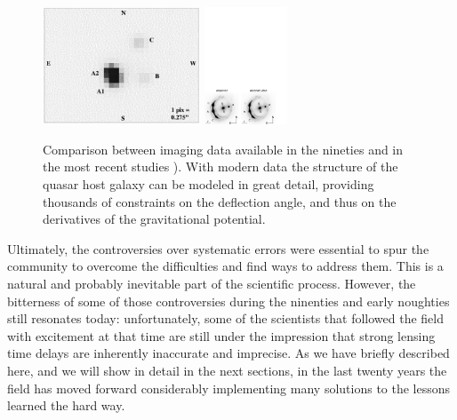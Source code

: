\begin{figure}
\includegraphics[height=3.5cm]{figures/pg1115_blowup.png}
\includegraphics[height=3.5cm]{figures/Suyu14_fig1.pdf}
\caption{Comparison between imaging data available in the nineties
\citep[left panel, from][]{Sch++97} and in the most recent studies
\citep[middle and right panels, from][]{Suy++14}). With modern data the
structure of the quasar host galaxy can be modeled in great detail,
providing thousands of constraints on the deflection angle, and thus on
the derivatives of the gravitational potential.}
\label{fig:oldvsmodernimage}
\end{figure}

Ultimately, the controversies over systematic errors were essential to
spur the community to overcome the difficulties and find ways to
address them. This is a natural and probably inevitable part of the
scientific process. However, the bitterness of some of those
controversies during the ninenties and early noughties still resonates
today: unfortunately, some of the scientists that followed the field
with excitement at that time are still under the impression that
strong lensing time delays are inherently inaccurate and imprecise. As
we have briefly described here, and we will show in detail in the
next sections, in the last twenty years the field has moved forward
considerably implementing many solutions to the lessons learned the
hard way.
